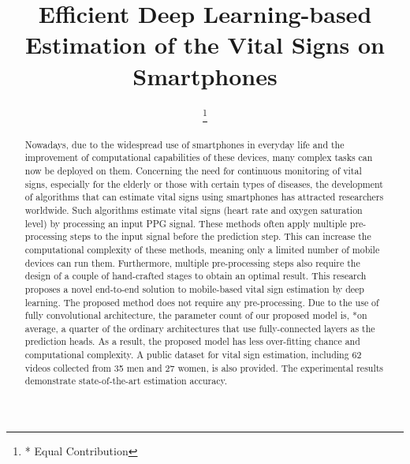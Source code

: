 \documentclass[conference]{IEEEtran}
\begin{document}
\title{Efficient Deep Learning-based Estimation of the Vital Signs on Smartphones}

\author{



\thanks{* Equal Contribution}
}

\maketitle







\begin{abstract}

Nowadays, due to the widespread use of smartphones in everyday life and the improvement of computational capabilities of these devices, many complex tasks can now be deployed on them. Concerning the need for continuous monitoring of vital signs, especially for the elderly or those with certain types of diseases, the development of algorithms that can estimate vital signs using smartphones has attracted researchers worldwide. Such algorithms estimate vital signs (heart rate and oxygen saturation level) by processing an input PPG signal. These methods often apply multiple pre-processing steps to the input signal before the prediction step. This can increase the computational complexity of these methods, meaning only a limited number of mobile devices can run them. Furthermore, multiple pre-processing steps also require the design of a couple of hand-crafted stages to obtain an optimal result. This research proposes a novel end-to-end solution to mobile-based vital sign estimation by deep learning. The proposed method does not require any pre-processing. Due to the use of fully convolutional architecture, the parameter count of our proposed model is, *on average, a quarter of the ordinary architectures that use fully-connected layers as the prediction heads. As a result, the proposed model has less over-fitting chance and computational complexity. A public dataset for vital sign estimation, including 62 videos collected from 35 men and 27 women, is also provided. The experimental results demonstrate state-of-the-art estimation accuracy.

\end{abstract}
\end{document}

